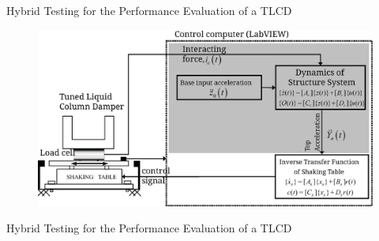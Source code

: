 \documentclass[usepdftitle=false]{beamer}
\begin{document}
\begin{frame}{Hybrid Testing for the Performance Evaluation of a TLCD}
\begin{figure}[ht]
\centering
\setcounter{subfigure}{0}
\includegraphics[width=1\textwidth] {figure/4-3.eps}
\label{fig:4-3}
\end{figure}
\end{frame}

\begin{frame}{Hybrid Testing for the Performance Evaluation of a TLCD}
\begin{figure}[!ht]
\centering
\setcounter{subfigure}{0}
\label{fig:4-4}
\end{figure}
\end{frame}
\end{document}
